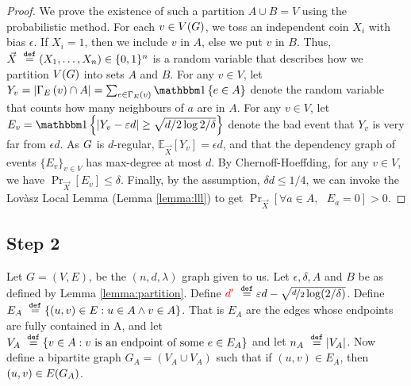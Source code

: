 \documentclass[11pt]{article}
\newcommand{\EnDeeLambda}{(n, d, \lambda)}
\newcommand{\EdgesShort}{E}
\newcommand{\Mean}[2]{\mathbb{E}_{#1}\left[#2\right]}
\newcommand{\PProb}[2]{\Pr_{#2}\left[#1 \right]}
\newcommand{\dApproxLower}{\textcolor{red}{d'}}
\newcommand{\dApproxExpandedLower}{\textcolor{black}{\epsilon d - \sqrt{\nicefrac{d}{2}\log (2/\delta)}}}
\begin{document}
\begin{proof}We prove the existence of such a partition $A \cup B = V$ using the probabilistic method.
For each $v \in V(G)$, we toss an independent coin $X_i$ with bias $\epsilon$.
If $X_i = 1$, then we include $v$ in $A$, else we put $v$ in $B$.
Thus, $\vec{X} \text{ }\overset{\mathtt{def}}{=} (X_1, \dots, X_n) \in \{0,1\}^n$ is a random variable that describes how we partition $V(G)$ into sets $A$ and $B$.
For any $v \in V$, let $Y_v = |\Neighbourhood{\EdgesShort}{v} \cap A| = \sum_{e \in \Neighbourhood{E}{v}} \Indicator{e \in A}$ denote the random variable that counts how many neighbours of $a$ are in $A$.
For any $v \in V$, let $E_v = \Indicator{|Y_v -\epsilon d| \geq \sqrt{d/2\log 2/\delta}}$ denote the bad event that $Y_v$ is very far from $\epsilon d$.
As $G$ is $d$-regular, $\Mean{\vec{X}}{Y_v} = \epsilon d$, and that the dependency graph of events $\{ E_v \}_{v \in V}$ has max-degree at most $d$.
By Chernoff-Hoeffding, for any $v \in V$, we have $\PProb{E_v}{\vec{X}} \leq \delta$.
Finally, by the assumption, $\delta d \leq 1/4$, we can 
invoke the Lov\`asz Local Lemma (Lemma \ref{lemma:lll}) to get $\PProb{\forall a \in A, \text{ } E_a = 0}{\vec{X}} > 0$.
\end{proof}



\subsection{Step 2}

Let $G=(V,E)$, be the $\EnDeeLambda$ graph given to us. 
Let $\epsilon, \delta, A$ and $B$ be as defined by Lemma \ref{lemma:partition}. 
Define $\dApproxLower \Def \dApproxExpandedLower$.
Define $E_A \text{ }\overset{\mathtt{def}}{=} \{ (u,v) \in E : u \in A \land v \in A\}$. 
That is $E_A$ are the edges whose endpoints are fully contained in A, and let $V_A \text{ }\overset{\mathtt{def}}{=} \{ v \in A: \text{$v$ is an endpoint of some $e \in E_A$}\}$ and let $ n_A \text{ }\overset{\mathtt{def}}{=} |V_A|$.
Now define a bipartite graph $G_A = (V_A \cup V_A)$ such that if $(u,v) \in E_A$, then $(u,v) \in E(G_A)$.
\end{document}
